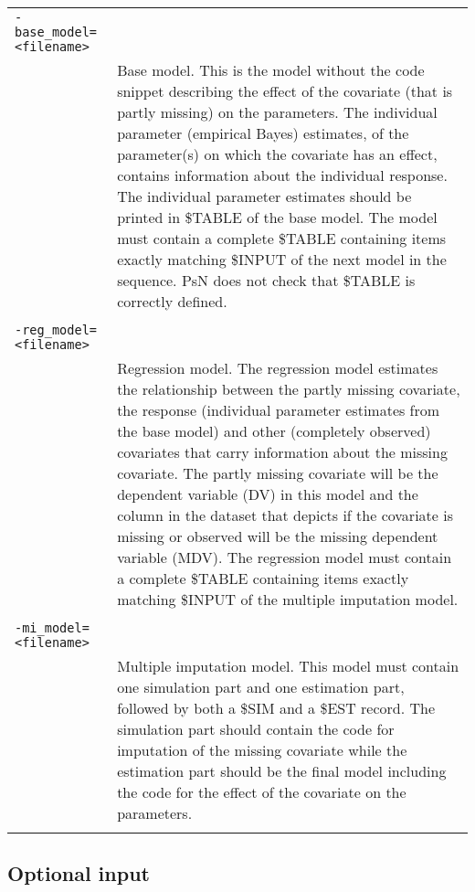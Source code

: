 \documentclass[a4paper,12pt]{article}
\begin{document}
\begin{longtable}{p{1in}p{4in}}
\verb|-base_model=<filename>| & \\
\nopagebreak
 & Base model. This is the model without the code snippet describing the effect of the covariate (that is partly missing) on the parameters. The individual parameter (empirical Bayes) estimates, of the parameter(s) on which the covariate has an effect, contains information about the individual response. The individual parameter estimates should be printed in \$TABLE of the base model. The model must contain a complete \$TABLE containing items exactly matching \$INPUT of the next model in the sequence. PsN does not check that \$TABLE is correctly defined.  \\
\\
\verb|-reg_model=<filename>| & \\
\nopagebreak
 & Regression model.  The regression model estimates the relationship between the partly missing covariate, the response (individual parameter estimates from the base model) and other (completely observed) covariates that carry information about the missing covariate. The partly missing covariate will be the dependent variable (DV) in this model and the column in the dataset that depicts if the covariate is missing or observed will be the missing dependent variable (MDV). The regression model must contain a complete \$TABLE containing items exactly matching \$INPUT of the multiple imputation model. \\
\\
\verb|-mi_model=<filename>| & \\
\nopagebreak
 & Multiple imputation model. This model must contain one simulation part and one estimation part, followed by both a \$SIM and a \$EST record. The simulation part should contain the code for imputation of the missing covariate while the estimation part should be the final model including the code for the effect of the covariate on the parameters. \\
\\
\end{longtable}


\pagebreak

\subsection{Optional input}
\end{document}
